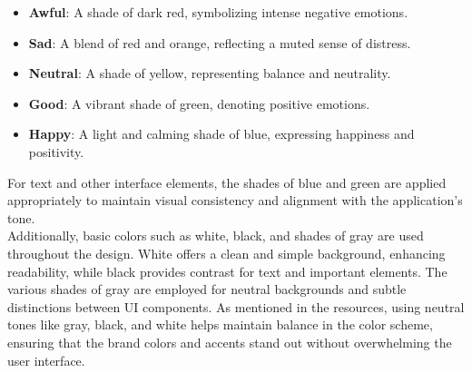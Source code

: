 \begin{itemize}
    \item \textbf{Awful}: A shade of dark red, symbolizing intense negative emotions.
    \item \textbf{Sad}: A blend of red and orange, reflecting a muted sense of distress.
    \item \textbf{Neutral}: A shade of yellow, representing balance and neutrality.
    \item \textbf{Good}: A vibrant shade of green, denoting positive emotions.
    \item \textbf{Happy}: A light and calming shade of blue, expressing happiness and positivity.
\end{itemize}

\noindent For text and other interface elements, the shades of blue and green are applied appropriately to maintain visual consistency and alignment with the application's tone.\vspace{5mm} \\
Additionally, basic colors such as white, black, and shades of gray are used throughout the design. White offers a clean and simple background, enhancing readability, while black provides contrast for text and important elements. The various shades of gray are employed for neutral backgrounds and subtle distinctions between UI components. As mentioned in the resources, using neutral tones like gray, black, and white helps maintain balance in the color scheme, ensuring that the brand colors and accents stand out without overwhelming the user interface.

\vspace{5mm}


